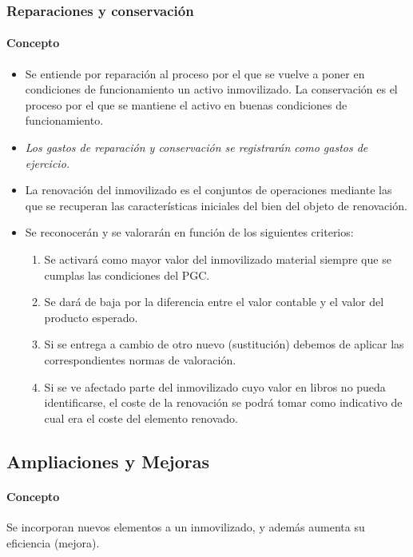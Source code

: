 \documentclass[a4paper,12pt]{article}
\begin{document}
\subsubsection{Reparaciones y conservación}
\paragraph{Concepto}
\begin{itemize}
    \item Se entiende por reparación al proceso por el que se vuelve a poner en condiciones de funcionamiento un activo inmovilizado. La conservación es el proceso por el que se mantiene el activo en buenas condiciones de funcionamiento.
    \item \textit{Los gastos de reparación y conservación se registrarán como gastos de ejercicio.}
    \item La renovación del inmovilizado es el conjuntos de operaciones mediante las que se recuperan las características iniciales del bien del objeto de renovación.
    \item Se reconocerán y se valorarán en función de los siguientes criterios:
    \begin{enumerate}[label=\alph*)]
        \item Se activará como mayor valor del inmovilizado material siempre que se cumplas las condiciones del PGC.
        \item Se dará de baja por la diferencia entre el valor contable y el valor del producto esperado.
        \item Si se entrega a cambio de otro nuevo (sustitución) debemos de aplicar las correspondientes normas de valoración.
        \item Si se ve afectado parte del inmovilizado cuyo valor en libros no pueda identificarse, el coste de la renovación se podrá tomar como indicativo de cual era el coste del elemento renovado.
    \end{enumerate}
    
\end{itemize}

\subsection{Ampliaciones y Mejoras}
\paragraph{Concepto}
Se incorporan nuevos elementos a un inmovilizado, y además aumenta su eficiencia (mejora).
\end{document}
